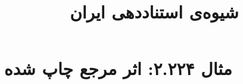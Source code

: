 \documentclass[a4paper,10pt]{article}
\begin{document}
\title{شیوه‌ی استناددهی ایران
 }
\author{}
\date{}
\maketitle



\section*{مثال ۲.۲۲۴: اثر مرجع چاپ شده}

\cite{پاکباز1378}\\
\cite{filippelli1990}\\






\end{document}
